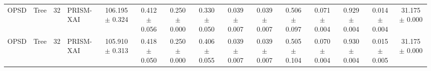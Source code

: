 \begin{table}[t]
\begin{tabular}{llllccccccccccc}
OPSD & Tree & 32 & PRISM-XAI & 106.195 $\pm$ 0.324 & 0.412 $\pm$ 0.056 & 0.250 $\pm$ 0.000 & 0.330 $\pm$ 0.050 & 0.039 $\pm$ 0.007 & 0.039 $\pm$ 0.007 & 0.506 $\pm$ 0.097 & 0.071 $\pm$ 0.004 & 0.929 $\pm$ 0.004 & 0.014 $\pm$ 0.004 & 31.175 $\pm$ 0.000 \\
OPSD & Tree & 32 & PRISM-XAI & 105.910 $\pm$ 0.313 & 0.418 $\pm$ 0.050 & 0.250 $\pm$ 0.000 & 0.406 $\pm$ 0.055 & 0.039 $\pm$ 0.007 & 0.039 $\pm$ 0.007 & 0.505 $\pm$ 0.104 & 0.070 $\pm$ 0.004 & 0.930 $\pm$ 0.004 & 0.015 $\pm$ 0.005 & 31.175 $\pm$ 0.000 \\
\bottomrule
\end{tabular}
\end{table}
